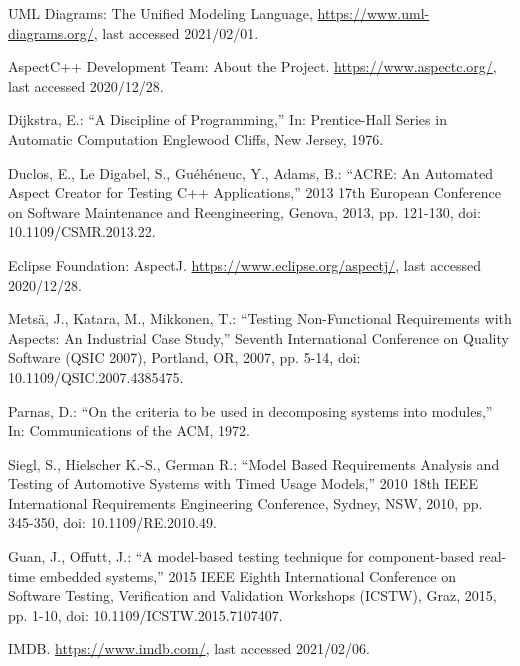 \documentclass[a4paper,10pt, bibliography=totocnumbered]{scrreprt}
\begin{document}
\begin{thebibliography}{9}
 UML Diagrams: The Unified Modeling Language, \url{https://www.uml-diagrams.org/}, last accessed 2021/02/01.




 AspectC++ Development Team: About the Project.
\url{https://www.aspectc.org/}, last accessed 2020/12/28.

 Dijkstra, E.: \enquote{A Discipline of Programming,}
In: Prentice-Hall Series in Automatic Computation Englewood Cliffs, New Jersey, 1976.

 Duclos, E., Le Digabel, S., Guéhéneuc, Y.,  Adams, B.: \enquote{ACRE: An Automated Aspect Creator for Testing C++ Applications,} 2013 17th European Conference on Software Maintenance and Reengineering, Genova, 2013, pp. 121-130, doi: 10.1109/CSMR.2013.22.

 Eclipse Foundation: AspectJ.
\url{https://www.eclipse.org/aspectj/},  last accessed 2020/12/28.

 Metsä, J., Katara, M., Mikkonen, T.: \enquote{Testing Non-Functional Requirements with Aspects: An Industrial Case Study,} Seventh International Conference on Quality Software (QSIC 2007), Portland, OR, 2007, pp. 5-14, doi: 10.1109/QSIC.2007.4385475.

 Parnas, D.: \enquote{On the criteria to be used in decomposing systems into modules,}
In: Communications of the ACM, 1972.



 Siegl, S., Hielscher K.-S., German R.: \enquote{Model Based Requirements Analysis and Testing of Automotive Systems with Timed Usage Models,} 2010 18th IEEE International Requirements Engineering Conference, Sydney, NSW, 2010, pp. 345-350, doi: 10.1109/RE.2010.49.

 Guan, J., Offutt, J.: \enquote{A model-based testing technique for component-based real-time embedded systems,} 2015 IEEE Eighth International Conference on Software Testing, Verification and Validation Workshops (ICSTW), Graz, 2015, pp. 1-10, doi: 10.1109/ICSTW.2015.7107407.

 IMDB. \url{https://www.imdb.com/}, last accessed 2021/02/06.





\end{thebibliography}
\end{document}
